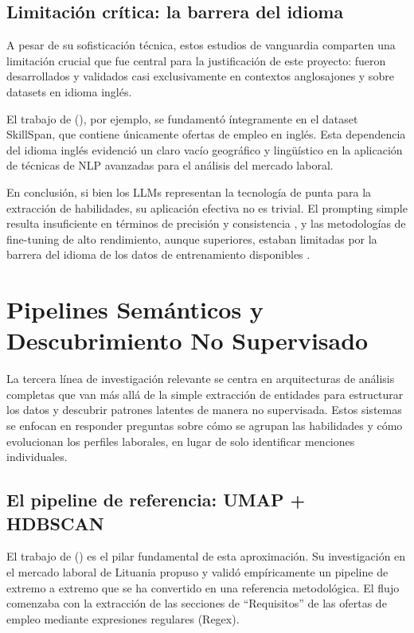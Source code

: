 \subsection{Limitación crítica: la barrera del idioma}

A pesar de su sofisticación técnica, estos estudios de vanguardia comparten una limitación crucial que fue central para la justificación de este proyecto: fueron desarrollados y validados casi exclusivamente en contextos anglosajones y sobre datasets en idioma inglés.

El trabajo de \citeauthor{herandi2024} (\citeyear{herandi2024}), por ejemplo, se fundamentó íntegramente en el dataset SkillSpan, que contiene únicamente ofertas de empleo en inglés. Esta dependencia del idioma inglés evidenció un claro vacío geográfico y lingüístico en la aplicación de técnicas de NLP avanzadas para el análisis del mercado laboral.

En conclusión, si bien los LLMs representan la tecnología de punta para la extracción de habilidades, su aplicación efectiva no es trivial. El prompting simple resulta insuficiente en términos de precisión y consistencia \cite{nguyen2024}, y las metodologías de fine-tuning de alto rendimiento, aunque superiores, estaban limitadas por la barrera del idioma de los datos de entrenamiento disponibles \cite{herandi2024}.

\section{Pipelines Semánticos y Descubrimiento No Supervisado}

La tercera línea de investigación relevante se centra en arquitecturas de análisis completas que van más allá de la simple extracción de entidades para estructurar los datos y descubrir patrones latentes de manera no supervisada. Estos sistemas se enfocan en responder preguntas sobre cómo se agrupan las habilidades y cómo evolucionan los perfiles laborales, en lugar de solo identificar menciones individuales.

\subsection{El pipeline de referencia: UMAP + HDBSCAN}

El trabajo de \citeauthor{lukauskas2023} (\citeyear{lukauskas2023}) es el pilar fundamental de esta aproximación. Su investigación en el mercado laboral de Lituania propuso y validó empíricamente un pipeline de extremo a extremo que se ha convertido en una referencia metodológica. El flujo comenzaba con la extracción de las secciones de ``Requisitos'' de las ofertas de empleo mediante expresiones regulares (Regex).

